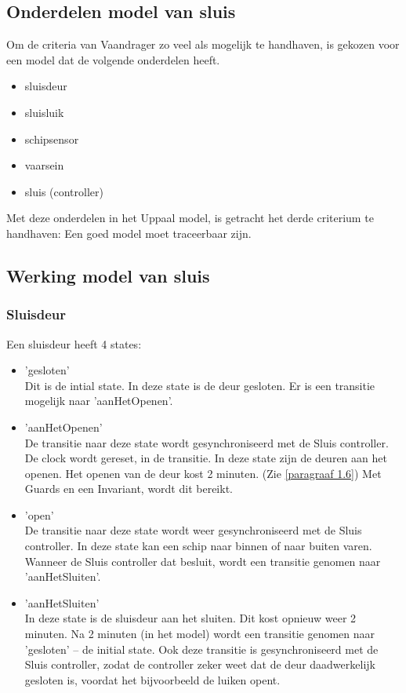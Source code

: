 \documentclass{article} %
\begin{document}
\subsection{Onderdelen model van sluis}

Om de criteria van Vaandrager zo veel als mogelijk te handhaven, is gekozen voor een model dat de volgende onderdelen heeft.
\begin{itemize}
    \item sluisdeur
    \item sluisluik
    \item schipsensor
    \item vaarsein
    \item sluis (controller)
\end{itemize}

Met deze onderdelen in het Uppaal model, is getracht het derde criterium te handhaven: Een goed model moet traceerbaar zijn.
\newpage

\subsection{Werking model van sluis}

\subsubsection{Sluisdeur}

Een sluisdeur heeft 4 states:

\begin{itemize}
    \item 'gesloten' \\
    Dit is de intial state. In deze state is de deur gesloten. Er is een transitie mogelijk naar 'aanHetOpenen'.
    \item 'aanHetOpenen' \\
    De transitie naar deze state wordt gesynchroniseerd met de Sluis controller. De clock wordt gereset, in de transitie. In deze state zijn de deuren aan het openen. Het openen van de deur kost 2 minuten. (Zie \ref{paragraaf 1.6}) Met Guards en een Invariant, wordt dit bereikt.
    \item 'open' \\
    De transitie naar deze state wordt weer gesynchroniseerd met de Sluis controller. In deze state kan een schip naar binnen of naar buiten varen. Wanneer de Sluis controller dat besluit, wordt een transitie genomen naar 'aanHetSluiten'.
    \item 'aanHetSluiten' \\
    In deze state is de sluisdeur aan het sluiten. Dit kost opnieuw weer 2 minuten. Na 2 minuten (in het model) wordt een transitie genomen naar 'gesloten' -- de initial state. Ook deze transitie is gesynchroniseerd met de Sluis controller, zodat de controller zeker weet dat de deur daadwerkelijk gesloten is, voordat het bijvoorbeeld de luiken opent. 
    
\end{itemize}
\end{document}
